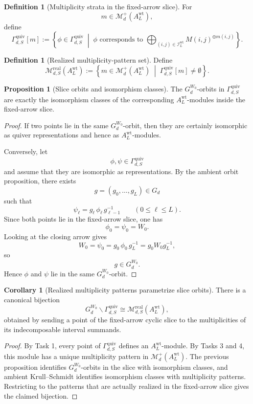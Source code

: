 \documentclass{article}
\theoremstyle{definition}
\newtheorem{proposition}[theorem]{Proposition}
\newtheorem{corollary}[theorem]{Corollary}
\newtheorem{definition}[theorem]{Definition}
\begin{document}
\begin{definition}[Multiplicity strata in the fixed-arrow slice]
For
\[
m\in \mathcal M_d^+(A_L^{\mathrm{wt}}),
\]
define
\[
\Gamma_{d,S}^{\mathrm{quiv}}[m]
:=
\left\{
\phi\in \Gamma_{d,S}^{\mathrm{quiv}}
\;\middle|\;
\phi \text{ corresponds to }
\bigoplus_{(i,j)\in \mathcal I_L^{\mathrm{wt}}}
M(i,j)^{\oplus m(i,j)}
\right\}.
\]
\end{definition}

\begin{definition}[Realized multiplicity-pattern set]
Define
\[
\mathcal M_{d,S}^{\mathrm{real}}(A_L^{\mathrm{wt}})
:=
\left\{
m\in \mathcal M_d^+(A_L^{\mathrm{wt}})
\;\middle|\;
\Gamma_{d,S}^{\mathrm{quiv}}[m]\neq \emptyset
\right\}.
\]
\end{definition}

\begin{proposition}[Slice orbits and isomorphism classes]
The $G_d^{W_0}$-orbits in $\Gamma_{d,S}^{\mathrm{quiv}}$ are exactly the
isomorphism classes of the corresponding $A_L^{\mathrm{wt}}$-modules inside the
fixed-arrow slice.
\end{proposition}

\begin{proof}
If two points lie in the same $G_d^{W_0}$-orbit, then they are certainly
isomorphic as quiver representations and hence as $A_L^{\mathrm{wt}}$-modules.

Conversely, let
\[
\phi,\psi\in \Gamma_{d,S}^{\mathrm{quiv}}
\]
and assume that they are isomorphic as representations. By the ambient orbit
proposition, there exists
\[
g=(g_0,\dots,g_L)\in G_d
\]
such that
\[
\psi_\ell=g_\ell\,\phi_\ell\,g_{\ell-1}^{-1}
\qquad
(0\le \ell\le L).
\]
Since both points lie in the fixed-arrow slice, one has
\[
\phi_0=\psi_0=W_0.
\]
Looking at the closing arrow gives
\[
W_0=\psi_0=g_0\,\phi_0\,g_L^{-1}=g_0W_0g_L^{-1},
\]
so
\[
g\in G_d^{W_0}.
\]
Hence $\phi$ and $\psi$ lie in the same $G_d^{W_0}$-orbit.
\end{proof}

\begin{corollary}[Realized multiplicity patterns parametrize slice orbits]
There is a canonical bijection
\[
G_d^{W_0}\backslash \Gamma_{d,S}^{\mathrm{quiv}}
\cong
\mathcal M_{d,S}^{\mathrm{real}}(A_L^{\mathrm{wt}}),
\]
obtained by sending a point of the fixed-arrow cyclic slice to the
multiplicities of its indecomposable interval summands.
\end{corollary}

\begin{proof}
By Task 1, every point of $\Gamma_{d,S}^{\mathrm{quiv}}$ defines an
$A_L^{\mathrm{wt}}$-module. By Tasks 3 and 4, this module has a unique
multiplicity pattern in $\mathcal M_d^+(A_L^{\mathrm{wt}})$. The previous
proposition identifies $G_d^{W_0}$-orbits in the slice with isomorphism
classes, and ambient Krull--Schmidt identifies isomorphism classes with
multiplicity patterns. Restricting to the patterns that are actually realized in
the fixed-arrow slice gives the claimed bijection.
\end{proof}
\end{document}
